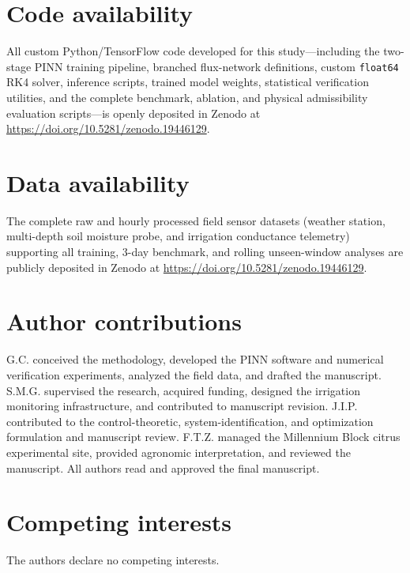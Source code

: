 \documentclass[pdflatex,sn-nature]{sn-jnl}%
\theoremstyle{thmstyleone}%
\theoremstyle{thmstyletwo}%
\theoremstyle{thmstylethree}%
\begin{document}
\section*{Code availability}
All custom Python/TensorFlow code developed for this study—including the two-stage PINN training pipeline, branched flux-network definitions, custom \texttt{float64} RK4 solver, inference scripts, trained model weights, statistical verification utilities, and the complete benchmark, ablation, and physical admissibility evaluation scripts—is openly deposited in Zenodo at \url{https://doi.org/10.5281/zenodo.19446129}.

\section*{Data availability}
The complete raw and hourly processed field sensor datasets (weather station, multi-depth soil moisture probe, and irrigation conductance telemetry) supporting all training, 3-day benchmark, and rolling unseen-window analyses are publicly deposited in Zenodo at \url{https://doi.org/10.5281/zenodo.19446129}.

\section*{Author contributions}
G.C. conceived the methodology, developed the PINN software and numerical verification experiments, analyzed the field data, and drafted the manuscript. S.M.G. supervised the research, acquired funding, designed the irrigation monitoring infrastructure, and contributed to manuscript revision. J.I.P. contributed to the control-theoretic, system-identification, and optimization formulation and manuscript review. F.T.Z. managed the Millennium Block citrus experimental site, provided agronomic interpretation, and reviewed the manuscript. All authors read and approved the final manuscript.

\section*{Competing interests}
The authors declare no competing interests.

\end{document}
